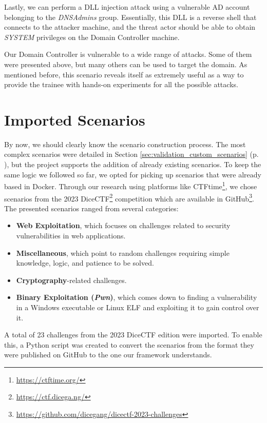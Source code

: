 Lastly, we can perform a DLL injection attack using a vulnerable AD account belonging to the \textit{DNSAdmins} group. Essentially, this DLL is a reverse shell that connects to the attacker machine, and the threat actor should be able to obtain \textit{SYSTEM} privileges on the Domain Controller machine. 

Our Domain Controller is vulnerable to a wide range of attacks. Some of them were presented above, but many others can be used to target the domain. As mentioned before, this scenario reveals itself as extremely useful as a way to provide the trainee with hands-on experiments for all the possible attacks.

\section{Imported Scenarios} \label{sec:validation_imported_scenarios}

By now, we should clearly know the scenario construction process. The most complex scenarios were detailed in Section \ref{sec:validation_custom_scenarios} (p. \pageref{sec:validation_custom_scenarios}), but the project supports the addition of already existing scenarios. To keep the same logic we followed so far, we opted for picking up scenarios that were already based in Docker. Through our research using platforms like CTFtime\footnote{\url{https://ctftime.org/}}, we chose scenarios from the 2023 DiceCTF\footnote{\url{https://ctf.dicega.ng/}} competition which are available in GitHub\footnote{\url{https://github.com/dicegang/dicectf-2023-challenges}}. The presented scenarios ranged from several categories:

\begin{itemize}
    \item \textbf{Web Exploitation}, which focuses on challenges related to security vulnerabilities in web applications.
    \item \textbf{Miscellaneous}, which point to random challenges requiring simple knowledge, logic, and patience to be solved.
    \item \textbf{Cryptography}-related challenges.
    \item \textbf{Binary Exploitation (\textit{Pwn})}, which comes down to finding a vulnerability in a Windows executable or Linux ELF and exploiting it to gain control over it.
\end{itemize}

A total of 23 challenges from the 2023 DiceCTF edition were imported. To enable this, a Python script was created to convert the scenarios from the format they were published on GitHub to the one our framework understands.

